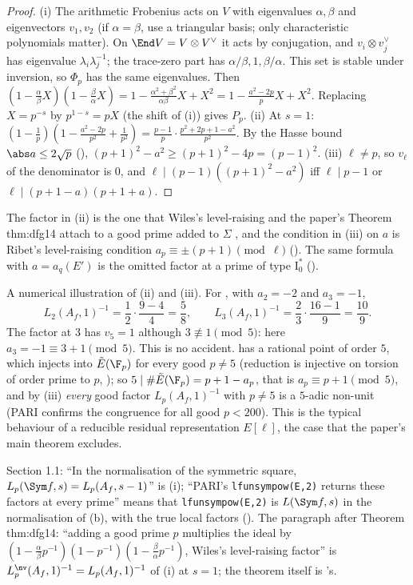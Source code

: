 \begin{proof}
(i) The arithmetic Frobenius acts on $V$ with eigenvalues $\alpha,\beta$ and eigenvectors $v_1,v_2$ (if $\alpha=\beta$, use a triangular basis; only characteristic
polynomials matter). On $\End V=V\otimes V^\vee$ it acts by conjugation, and $v_i\otimes v_j^\vee$ has eigenvalue $\lambda_i\lambda_j^{-1}$; the trace-zero part has
$\alpha/\beta,1,\beta/\alpha$. This set is stable under inversion, so $\Phi_p$ has the same eigenvalues. Then
$(1-\frac\alpha\beta X)(1-\frac\beta\alpha X)=1-\frac{\alpha^2+\beta^2}{\alpha\beta}X+X^2=1-\frac{a^2-2p}pX+X^2$. Replacing $X=p^{-s}$ by $p^{1-s}=pX$ (the shift of
(i)) gives $P_p$.
(ii) At $s=1$: $(1-\frac1p)(1-\frac{a^2-2p}{p^2}+\frac1{p^2})=\frac{p-1}p\cdot\frac{p^2+2p+1-a^2}{p^2}$. By the Hasse bound $\abs a\le2\sqrt p$ (),
$(p+1)^2-a^2\ge(p+1)^2-4p=(p-1)^2$.
(iii) $\ell\ne p$, so $v_\ell$ of the denominator is $0$, and $\ell\mid(p-1)((p+1)^2-a^2)$ iff $\ell\mid p-1$ or $\ell\mid(p+1-a)(p+1+a)$.
\end{proof}

The factor in (ii) is the one that Wiles's level-raising and the paper's Theorem thm:dfg14 attach to a good prime added to $\Sigma$ \cite{DDT}, and the
condition in (iii) on $a$ is Ribet's level-raising condition $a_p\equiv\pm(p+1)\pmod\ell$ (). The same formula with $a=a_q(E')$ is the omitted factor at a
prime of type $\mathrm I_0^*$ ().

A numerical illustration of (ii) and (iii). For , with $a_2=-2$ and $a_3=-1$,
\[
L_2(A_f,1)^{-1}=\frac12\cdot\frac{9-4}4=\frac58,\qquad L_3(A_f,1)^{-1}=\frac23\cdot\frac{16-1}9=\frac{10}9 .
\]
The factor at $3$ has $v_5=1$ although $3\not\equiv1\pmod5$: here $a_3=-1\equiv3+1\pmod5$. This is no accident.  has a rational point of order $5$, which injects
into $\tilde E(\F_p)$ for every good $p\ne5$ (reduction is injective on torsion of order prime to $p$, ); so $5\mid\#\tilde E(\F_p)=p+1-a_p$, that is
$a_p\equiv p+1\pmod5$, and by (iii) \emph{every} good factor $L_p(A_f,1)^{-1}$ with $p\ne5$ is a $5$-adic non-unit (PARI confirms the congruence for all good $p<200$). This
is the typical behaviour of a reducible residual representation $E[\ell]$, the case that the paper's main theorem excludes.

\begin{paperlink}
Section 1.1: ``In the normalisation of the symmetric square, $L_p(\Sym f,s)=L_p(A_f,s-1)$'' is (i); ``PARI's \texttt{lfunsympow(E,2)}
returns these factors at every prime'' means that \texttt{lfunsympow(E,2)} is $L(\Sym f,s)$ in the normalisation of (b), with the true
local factors (). The paragraph after Theorem thm:dfg14: ``adding a good prime $p$ multiplies the ideal by
$(1-\frac\alpha\beta p^{-1})(1-p^{-1})(1-\frac\beta\alpha p^{-1})$, Wiles's level-raising factor'' is $L_p^{\nv}(A_f,1)^{-1}=L_p(A_f,1)^{-1}$ of
(i) at $s=1$; the theorem itself is 's.
\end{paperlink}

